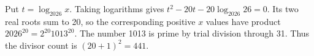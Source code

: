 Put $t=\log_{2026}x$. Taking logarithms gives $t^2-20t-20\log_{2026}26=0$. Its two real roots sum to 20, so the corresponding positive $x$ values have product $2026^{20}=2^{20}1013^{20}$. The number 1013 is prime by trial division through 31. Thus the divisor count is $(20+1)^2=\boxed{441}$.
